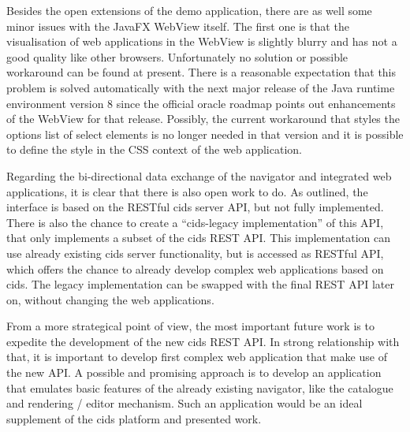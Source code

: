 Besides the open extensions of the demo application, there are as well some minor issues with the JavaFX WebView itself. 
The first one is that the visualisation of web applications in the WebView is slightly blurry and has not a good quality like other browsers. 
Unfortunately no solution or possible workaround can be found at present. There is a reasonable expectation that this problem is  solved automatically with the next major release of the Java runtime environment version 8 since the official oracle roadmap points out enhancements of the WebView for that release. 
Possibly, the current workaround that styles the options list of select elements is no longer needed in that version and it is possible to define the style in the CSS context of the web application.
   
Regarding the bi-directional data exchange of the navigator and integrated web applications, it is clear that there is also open work to do.  
As outlined, the interface is based on the RESTful cids server API, but not fully implemented. 
There is also the chance to create a \enquote{cids-legacy implementation} of this API, that only implements a subset of the cids REST API. 
This implementation can use already existing cids server functionality, but is accessed as RESTful API, which offers the chance to already develop complex web applications based on cids. 
The legacy implementation can be swapped with the final REST API later on, without changing the web applications.

From a more strategical point of view, the most important future work is to expedite the development of the new cids REST API. 
In strong relationship with that, it is important to develop first complex web application that make use of the new API. 
A possible and promising approach is to develop an application that emulates basic features of the already existing navigator, like the catalogue and rendering / editor mechanism. 
Such an application would be an ideal supplement of the cids platform and presented work.
 
